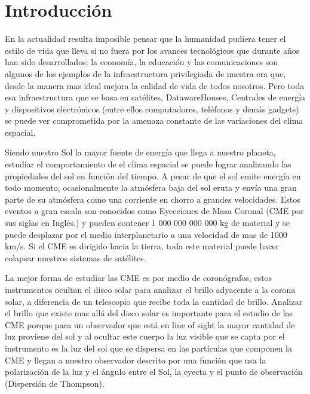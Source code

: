 



\section*{Introducción}
En la actualidad resulta imposible pensar que la humanidad pudiera tener el estilo de vida que lleva si no fuera por los avances tecnológicos que durante años han sido desarrollados; la economía, la educación y las comunicaciones son algunos de los ejemplos de la infraestructura privilegiada de nuestra era que, desde la manera mas ideal mejora la calidad de vida de todos nosotros. Pero toda esa infraestructura que se basa en satélites, DatawareHouses, Centrales de energía y dispositivos electrónicos (entre ellos computadores, teléfonos y demás gadgets) se puede ver comprometida por la amenaza constante de las variaciones del clima espacial.

Siendo nuestro Sol la mayor fuente de energía que llega a nuestro planeta, estudiar el comportamiento de el clima espacial se puede lograr analizando las propiedades del sol en función del tiempo. A pesar de que el sol emite energía en todo momento, ocasionalmente la atmósfera baja del sol eruta y envía una gran parte de su atmósfera como una corriente en chorro a grandes velocidades. Estos eventos a gran escala son conocidos como Eyecciones de Masa Coronal (CME por sus siglas en Inglés.) y pueden contener 1 000 000 000 000 kg de material y se puede desplazar por el medio interplanetario a una velocidad de mas de 1000 km/s. Si el CME es dirigido hacia la tierra, toda este material puede hacer colapsar nuestros sistemas de satélites.

La mejor forma de estudiar las CME es por medio de coronógrafos, estos instrumentos ocultan el disco solar para analizar el brillo adyacente a la corona solar, a diferencia de un telescopio que recibe toda la cantidad de brillo. Analizar el brillo que existe mas allá del disco solar es importante para el estudio de las CME porque para un observador que está en line of sight la mayor cantidad de luz proviene del sol y al ocultar este cuerpo la luz visible que se capta por el instrumento es la luz del sol que se dispersa en las partículas que componen la CME y llegan a nuestro observador descrito por una función que usa la polarización de la luz y el ángulo entre el Sol, la eyecta y el punto de observación (Dispersión de Thompson).


